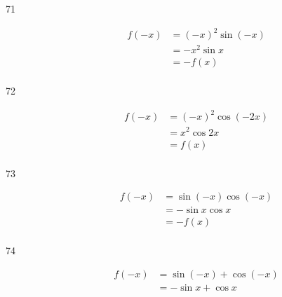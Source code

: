 \documentclass{exam}
\begin{document}
\begin{description}


      \item[71]
        \begin{align*}
          f(-x) & = (-x)^2 \sin(-x) \\
                & = - x^2 \sin x \\
                & = - f(x) \\
        \end{align*}


      \item[72]
        \begin{align*}
          f(-x) & = (-x)^2 \cos(-2x) \\
                & = x^2 \cos 2x \\
                & = f(x) \\
        \end{align*}


      \item[73]
        \begin{align*}
          f(-x) & = \sin (-x) \cos (-x) \\
                & = - \sin x \cos x \\
                & = -f(x) \\
        \end{align*}


      \item[74]
        \begin{align*}
          f(-x) & = \sin (-x) + \cos (-x) \\
                & = - \sin x + \cos x \\
        \end{align*}


\end{description}
\end{document}
